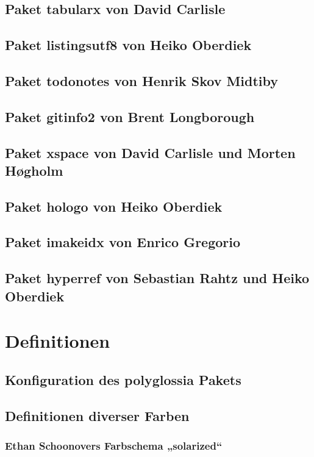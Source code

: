 \documentclass[a4paper,12pt]{article}
\begin{document}
			\section{Paket tabularx von David Carlisle}
				
			\section{Paket listingsutf8 von Heiko Oberdiek}
				
			\section{Paket todonotes von Henrik Skov Midtiby}
				
			\section{Paket gitinfo2 von Brent Longborough}
				
			\section{Paket xspace von David Carlisle und Morten Høgholm}
				
			\section{Paket hologo von Heiko Oberdiek}
				
			\section{Paket imakeidx von Enrico Gregorio}
				
			\section{Paket hyperref von Sebastian Rahtz und Heiko Oberdiek}
				
		\chapter{Definitionen}
			\section{Konfiguration des polyglossia Pakets}
				
			\section{Definitionen diverser Farben}
				\subsection{Ethan Schoonovers Farbschema „solarized“}
					
\end{document}
